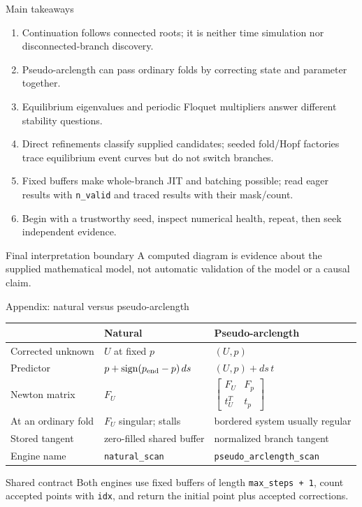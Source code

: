 \begin{frame}{Main takeaways}
\small
\begin{enumerate}
  \item Continuation follows connected roots; it is neither time simulation nor disconnected-branch discovery.
  \item Pseudo-arclength can pass ordinary folds by correcting state and parameter together.
  \item Equilibrium eigenvalues and periodic Floquet multipliers answer different stability questions.
  \item Direct refinements classify supplied candidates; seeded fold/Hopf
        factories trace equilibrium event curves but do not switch branches.
  \item Fixed buffers make whole-branch JIT and batching possible; read eager results with \texttt{n\_valid} and traced results with their mask/count.
  \item Begin with a trustworthy seed, inspect numerical health, repeat, then seek independent evidence.
\end{enumerate}

\vfill
\begin{alertblock}{Final interpretation boundary}
A computed diagram is evidence about the supplied mathematical model, not automatic validation of the model or a causal claim.
\end{alertblock}
\end{frame}

\begin{frame}{Appendix: natural versus pseudo-arclength}
\small
\begin{center}
\begin{tabular}{p{}p{}p{}}
\toprule
 & Natural & Pseudo-arclength\\
\midrule
Corrected unknown & $U$ at fixed $p$ & $(U,p)$\\
Predictor & $p+\operatorname{sign}(p_{\rm end}-p)\,ds$ & $(U,p)+ds\,t$\\
Newton matrix & $F_U$ & $\begin{bmatrix}F_U&F_p\\t_U^T&t_p\end{bmatrix}$\\[3mm]
At an ordinary fold & $F_U$ singular; stalls & bordered system usually regular\\
Stored tangent & zero-filled shared buffer & normalized branch tangent\\
Engine name & \texttt{natural\_scan} & \texttt{pseudo\_arclength\_scan}\\
\bottomrule
\end{tabular}
\end{center}

\begin{block}{Shared contract}
Both engines use fixed buffers of length \texttt{max\_steps + 1}, count
accepted points with \texttt{idx}, and return the initial point plus accepted corrections.
\end{block}
\end{frame}

